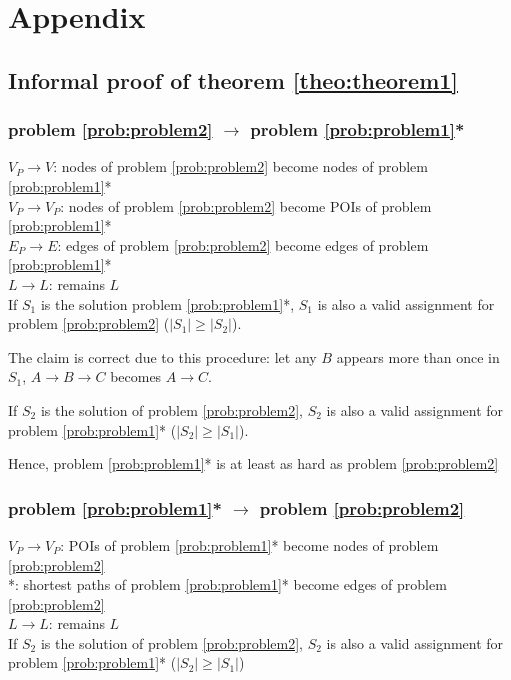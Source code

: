 \chapter{Appendix}

\section{Informal proof of theorem \ref{theo:theorem1}}
\subsection{problem \ref{prob:problem2} $\to$ problem \ref{prob:problem1}*}
$V_P \to V$: nodes of problem \ref{prob:problem2} become nodes of problem \ref{prob:problem1}*\\
$V_P \to V_P$: nodes of problem \ref{prob:problem2} become POIs of problem \ref{prob:problem1}*\\
$E_P \to E$: edges of problem \ref{prob:problem2} become edges of problem \ref{prob:problem1}*\\
$L \to L$: remains $L$\\

If $S_1$ is the solution problem \ref{prob:problem1}*, $S_1$ is also a valid assignment for problem \ref{prob:problem2} ($|S_1| \geq |S_2|$).

The claim is correct due to this procedure: let any $B$ appears more than once in $S_1$, $A \to B \to C$ becomes $A \to C$.

If $S_2$ is the solution of problem \ref{prob:problem2}, $S_2$ is also a valid assignment for problem \ref{prob:problem1}* ($|S_2| \geq |S_1|$).

Hence, problem \ref{prob:problem1}* is at least as hard as problem \ref{prob:problem2}

\subsection{problem \ref{prob:problem1}* $\to$ problem \ref{prob:problem2}}

$V_P \to V_P$: POIs of problem \ref{prob:problem1}* become nodes of problem \ref{prob:problem2}\\
*: shortest paths of problem \ref{prob:problem1}* become edges of problem \ref{prob:problem2}\\
$L \to L$: remains $L$\\

If $S_2$ is the solution of problem \ref{prob:problem2}, $S_2$ is also a valid assignment for problem \ref{prob:problem1}* ($|S_2| \geq |S_1|$)

